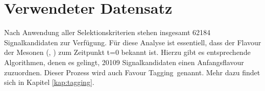 \section{Verwendeter Datensatz}
Nach Anwendung aller Selektionskriterien stehen insgesamt 62184 Signalkandidaten zur Verfügung. Für diese Analyse ist essentiell, dass der Flavour der Mesonen (\Bd, \Bdbar) zum Zeitpunkt t=0 bekannt ist. Hierzu gibt es entsprechende Algorithmen, denen es gelingt, 20109 Signalkandidaten einen Anfangsflavour zuzuordnen. Dieser Prozess wird auch \glqq Favour Tagging\grqq\ genannt. Mehr dazu findet sich in Kapitel \ref{kap:tagging}.